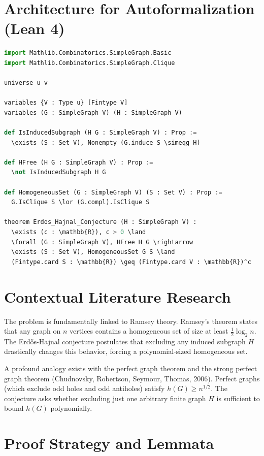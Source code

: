 \documentclass[12pt, a4paper]{article}
\begin{document}
\section{Architecture for Autoformalization (Lean 4)}

\begin{lstlisting}[language=Python, basicstyle=\ttfamily\small]
import Mathlib.Combinatorics.SimpleGraph.Basic
import Mathlib.Combinatorics.SimpleGraph.Clique

universe u v

variables {V : Type u} [Fintype V]
variables (G : SimpleGraph V) (H : SimpleGraph V)

def IsInducedSubgraph (H G : SimpleGraph V) : Prop :=
  \exists (S : Set V), Nonempty (G.induce S \simeqg H)

def HFree (H G : SimpleGraph V) : Prop :=
  \not IsInducedSubgraph H G

def HomogeneousSet (G : SimpleGraph V) (S : Set V) : Prop :=
  G.IsClique S \lor (G.compl).IsClique S

theorem Erdos_Hajnal_Conjecture (H : SimpleGraph V) :
  \exists (c : \mathbb{R}), c > 0 \land
  \forall (G : SimpleGraph V), HFree H G \rightarrow
  \exists (S : Set V), HomogeneousSet G S \land
  (Fintype.card S : \mathbb{R}) \geq (Fintype.card V : \mathbb{R})^c
\end{lstlisting}

\section{Contextual Literature Research}

The problem is fundamentally linked to Ramsey theory. Ramsey's theorem states that any graph on $n$ vertices contains a homogeneous set of size at least $\frac{1}{2} \log_2 n$. The Erd\H{o}s-Hajnal conjecture postulates that excluding any induced subgraph $H$ drastically changes this behavior, forcing a polynomial-sized homogeneous set.

A profound analogy exists with the perfect graph theorem and the strong perfect graph theorem (Chudnovsky, Robertson, Seymour, Thomas, 2006). Perfect graphs (which exclude odd holes and odd antiholes) satisfy $h(G) \geq n^{1/2}$. The conjecture asks whether excluding just one arbitrary finite graph $H$ is sufficient to bound $h(G)$ polynomially.

\section{Proof Strategy and Lemmata}
\end{document}
